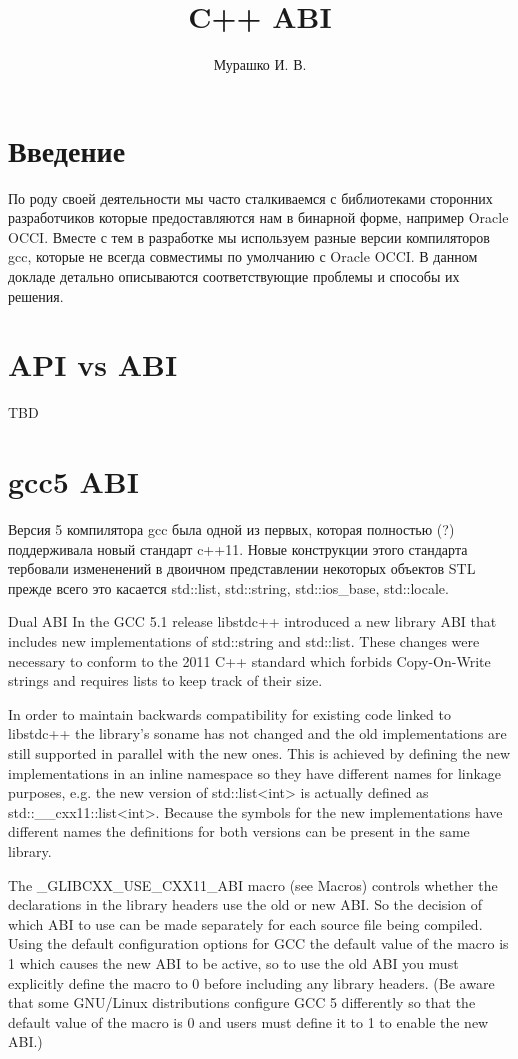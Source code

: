 \documentclass[14pt,a4paper]{article}
\title{C++ ABI}
\author{Мурашко И. В.}
\date{}
\begin{document}
\Russian

\maketitle

\section*{Введение}
По роду своей деятельности мы часто сталкиваемся с библиотеками сторонних 
разработчиков которые предоставляются нам в бинарной форме, например 
Oracle OCCI. Вместе с тем в разработке мы используем разные версии 
компиляторов gcc, которые не всегда совместимы по умолчанию с Oracle OCCI. 
В данном докладе детально описываются соответствующие проблемы и способы 
их решения. 

\section{API vs ABI}

TBD

\section{gcc5 ABI}

Версия 5 компилятора gcc была одной из первых, которая полностью (?)
поддерживала новый стандарт c++11. Новые конструкции этого стандарта
тербовали измененений в двоичном представлении некоторых объектов STL
прежде всего это касается std::list, std::string, std::ios\_base,
std::locale. 

Dual ABI
In the GCC 5.1 release libstdc++ introduced a new library ABI that
includes new implementations of std::string and std::list. These
changes were necessary to conform to the 2011 C++ standard which
forbids Copy-On-Write strings and requires lists to keep track of
their size. 

In order to maintain backwards compatibility for existing code linked
to libstdc++ the library's soname has not changed and the old
implementations are still supported in parallel with the new ones.
This is achieved by defining the new implementations in an inline
namespace so they have different names for linkage purposes, e.g. the
new version of std::list<int> is actually defined as
std::__cxx11::list<int>. Because the symbols for the new
implementations have different names the definitions for both versions
can be present in the same library. 

The \_GLIBCXX\_USE\_CXX11\_ABI macro (see Macros) controls whether the
declarations in the library headers use the old or new ABI. So the
decision of which ABI to use can be made separately for each source
file being compiled. Using the default configuration options for GCC
the default value of the macro is 1 which causes the new ABI to be
active, so to use the old ABI you must explicitly define the macro to
0 before including any library headers. (Be aware that some GNU/Linux
distributions configure GCC 5 differently so that the default value of
the macro is 0 and users must define it to 1 to enable the new ABI.) 
\end{document}
